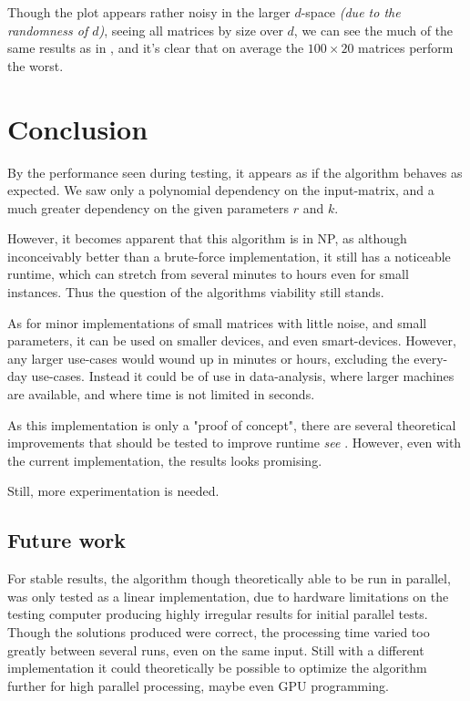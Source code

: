 \documentclass[a4paper]{article}
\begin{document}
Though the plot appears rather noisy in the larger $d$-space \textit{(due to the randomness of $d$)},
seeing all matrices by size over $d$, we can see the much of the same results as
in , and it's clear that on average the $100 \times 20$ matrices perform
the worst.

%
%

\section{Conclusion}
\label{sec:conclusion}
By the performance seen during testing, it appears as if the algorithm behaves as expected. We saw only a polynomial
dependency on the input-matrix, and a much greater dependency on the given parameters $r$ and $k$.

However, it becomes apparent that this algorithm is in NP, as although inconceivably better than a brute-force
implementation, it still has a noticeable runtime, which can stretch from several minutes to hours even for small instances.
Thus the question of the algorithms viability still stands.

As for minor implementations of small matrices with little noise, and small parameters, it can be used on smaller devices,
and even smart-devices. However, any larger use-cases would wound up in minutes or hours, excluding the every-day use-cases.
Instead it could be of use in data-analysis, where larger machines are available, and where time is not limited in seconds.

As this implementation is only a "proof of concept", there are several theoretical improvements that should be tested to improve
runtime \textit{see }. However, even with the current implementation, the results looks promising.

Still, more experimentation is needed.

\subsection{Future work}
\label{sec:future-work}
For stable results, the algorithm though theoretically able to be run in parallel, was only tested as a linear implementation,
due to hardware limitations on the testing computer producing highly irregular results for initial parallel tests.
Though the solutions produced were correct, the processing time varied too greatly between several runs, even on the same input.
Still with a different implementation it could theoretically be possible to optimize the algorithm further
for high parallel processing, maybe even GPU programming.
\end{document}
